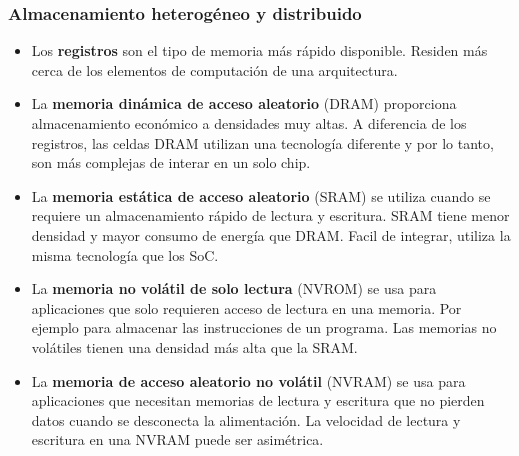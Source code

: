 \documentclass[aspectratio=169]{beamer}
\begin{document}
\begin{frame}[fragile]
    \frametitle{Almacenamiento heterogéneo y distribuido}
    \small
    \begin{itemize}
    \item<1-> Los \textbf{registros} son el tipo de memoria más rápido disponible. \textcolor{verdeuca}{Residen más cerca de los elementos de computación de una arquitectura.}
    \item<2-> La \textbf{memoria dinámica de acceso aleatorio} (DRAM) proporciona almacenamiento económico a densidades muy altas. \textcolor{verdeuca}{A diferencia de los registros, las celdas DRAM utilizan una tecnología diferente y por lo tanto, son más complejas de interar en un solo chip.}
    \item<3-> La \textbf{memoria estática de acceso aleatorio} (SRAM) se utiliza cuando se requiere un almacenamiento rápido de lectura y escritura. \textcolor{verdeuca}{SRAM tiene menor densidad y mayor consumo de energía que DRAM. Facil de integrar, utiliza la misma tecnología que los SoC.}
    \item<4-> La \textbf{memoria no volátil de solo lectura} (NVROM) se usa para aplicaciones que solo requieren acceso de lectura en una memoria. \textcolor{verdeuca}{Por ejemplo para almacenar las instrucciones de un programa. Las memorias no volátiles tienen una densidad más alta que la SRAM.}
    \item<5-> La \textbf{memoria de acceso aleatorio no volátil} (NVRAM) se usa para aplicaciones que necesitan memorias de lectura y escritura que no pierden datos cuando se desconecta la alimentación. \textcolor{verdeuca}{La velocidad de lectura y escritura en una NVRAM puede ser asimétrica.}
    \end{itemize}
\end{frame}
\end{document}
